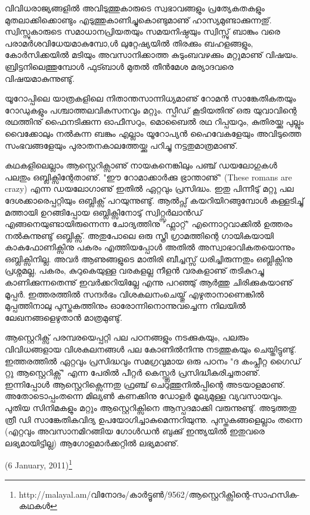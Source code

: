 വിവിധരാജ്യങ്ങളില്‍ അവിടുത്തുകാരുടെ സ്വഭാവങ്ങളും പ്രത്യേകതകളും മുതലാക്കിക്കൊണ്ടും എടുത്തുകാണിച്ചുകൊണ്ടുമാണു് 
ഹാസ്യമുണ്ടാക്കുന്നതു്. സ്വിസ്സുകാരുടെ സമാധാനപ്രിയതയും സമയനിഷ്ഠയും സ്വിസ്സു് ബാങ്കും 
വരെ പരാമര്‍ശവിധേയമാകുമ്പോ,ള്‍ ലുറ്റേഷ്യയില്‍ തിരക്കും ബഹളങ്ങളും, കോര്‍സിക്കയില്‍ മടിയും അവസാനിക്കാത്ത 
കുടുംബവഴക്കും മറ്റുമാണു് വിഷയം. ബ്രിട്ടനിലെത്തുമ്പോള്‍ ഫുട്ബാള്‍ മുതല്‍ തീന്‍മേശ മര്യാദവരെ വിഷയമാകുന്നുണ്ടു്.

യൂറോപ്പിലെ യാത്രകളിലെ നിതാന്തസാന്നിധ്യമാണു് റോമന്‍ സാങ്കേതികതയും റോഡുകളും പശ്ചാത്തലവികസനവും മറ്റും. 
സ്പീഡ് കൂടിയതിനു് ഒരു യുവാവിന്റെ രഥത്തിനു് ഫൈനടിക്കുന്ന ഓഫീസറും, മൊബൈല്‍ രഥ റിപ്പയറും, കുതിരയ്ക്കു പുല്ലും 
വൈക്കോലും നല്‍കുന്ന ബങ്കും എല്ലാം യൂറോപ്യന്‍ ഹൈവേകളേയും അവിടുത്തെ സംഭവങ്ങളേയും പുരാതനകാലത്തേയ്ക്കു 
പറിച്ചു നട്ടതുമാത്രമാണു്.

കഥകളിലെല്ലാം ആസ്റ്റെറിക്സാണു് നായകനെങ്കിലും പഞ്ച് ഡയലോഗുകള്‍ പലതും ഒബ്ലിക്സിന്റേതാണു്. "ഈ റോമാക്കാര്‍ക്കു 
ഭ്രാന്താണു്" (These romans are crazy) എന്ന ഡയലോഗാണു് ഇതില്‍ ഏറ്റവും പ്രസിദ്ധം. ഇതു പിന്നീടു് മറ്റു പല 
ദേശക്കാരെപ്പറ്റിയും ഒബ്ലിക്സ് പറയുന്നുണ്ടു്. ആല്‍പ്സ് കയറിയിറങ്ങുമ്പോള്‍ കള്ളടിച്ചു് മത്തായി ഉറങ്ങിപ്പോയ 
ഒബ്ലിക്സിനോടു് സ്വിറ്റ്സര്‍ലാന്‍ഡ് എങ്ങനെയുണ്ടായിരുന്നെന്ന ചോദ്യത്തിനു "ഫ്ലാറ്റ്" എന്നൊറ്റവാക്കില്‍ ഉത്തരം 
നല്‍കുന്നുണ്ടു് ഒബ്ലിക്സ്. അതുപോലെ ഒരു സ്ത്രീ ഗ്രാമത്തിന്റെ ഗായികയായി കാകഫോണിക്സിനു പകരം എത്തിയപ്പോള്‍ 
അതില്‍ അസ്വാഭാവികതയൊന്നും ഒബ്ലിക്സിനില്ല. അവര്‍ ആണുങ്ങളുടെ മാതിരി ബീച്ചസ്സ് ധരിച്ചിരുന്നതും ഒബ്ലിക്സിനു 
പ്രശ്നമല്ല, പകരം, കുറുകെയുള്ള വരകളല്ല നീളന്‍ വരകളാണു് തടികുറച്ചു കാണിക്കുന്നതെന്നു് ഇവര്‍ക്കറിയില്ലേ എന്നു 
പറഞ്ഞു് ആര്‍ത്തു ചിരിക്കുകയാണു് മൂപ്പര്‍. ഇത്തരത്തില്‍ സന്ദര്‍ഭം വിശകലനംചെയ്തു് എഴുതാനാണെങ്കില്‍ മുപ്പത്തിനാലു 
പുസ്തകത്തിനും ഓരോന്നിനൊന്നുവച്ചെന്ന നിലയില്‍ ലേഖനങ്ങളെഴുതാന്‍ മാത്രമുണ്ടു്.

ആസ്റ്റെറിക്സ് പരമ്പരയെപ്പറ്റി പല പഠനങ്ങളും നടക്കുകയും, പലരും വിവിധങ്ങളായ വിശകലനങ്ങള്‍ പല കോണില്‍നിന്നു
നടത്തുകയും ചെയ്തിട്ടുണ്ടു്. ഇത്തരത്തില്‍ ഏറ്റവും പ്രസിദ്ധവും സമഗ്രവുമായ ഒരു പഠനം "ദ കംപ്ലീറ്റ ഗൈഡ് റ്റു ആസ്റ്റെറിക്സ്"
എന്ന പേരില്‍ പീറ്റര്‍ കെസ്സ്ലര്‍ പ്രസിദ്ധീകരിച്ചതാണു്. ഇന്നിപ്പോള്‍ ആസ്റ്റെറിക്സെന്നതു ഫ്രഞ്ച് ചെറുത്തുനില്‍പ്പിന്റെ 
അടയാളമാണു്. അതോടൊപ്പംതന്നെ മില്യണ്‍ കണക്കിനു ഡോളര്‍ മൂല്യമുള്ള വ്യവസായവും. പുതിയ സിനിമകളും മറ്റും
ആസ്റ്റെറിക്സിനെ ആസ്പദമാക്കി വരുന്നുണ്ടു്. അടുത്തതു ത്രീ ഡി സാങ്കേതികവിദ്യ ഉപയോഗിച്ചാകുമെന്നറിയുന്നു. 
പുസ്തകങ്ങളെല്ലാം തന്നെ (എറ്റവും അവസാനമിറങ്ങിയ ഗോള്‍ഡന്‍ ബുക്കു് ഇന്ത്യയില്‍ ഇതുവരെ ലഭ്യമായിട്ടില്ല) 
ആഗോളമാര്‍ക്കറ്റില്‍ ലഭ്യമാണു്.

\begin{flushright}(6 January, 2011)\footnote{http://malayal.am/വിനോദം/കാര്‍ട്ടൂണ്‍/9562/ആസ്റ്റെറിക്സിന്റെ-സാഹസിക-കഥകള്‍}\end{flushright}

\newpage
